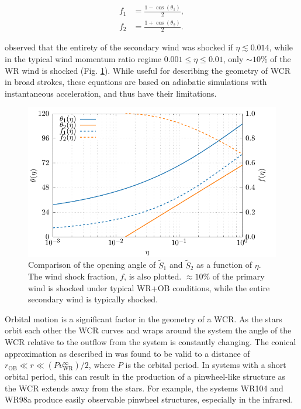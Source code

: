 \begin{subequations}
  \label{eq:windshockfraction}
  \begin{align}
    f_1 & = \frac{1 - \cos\left(\theta_1\right)}{2} , \\
    f_2 & = \frac{1 + \cos\left(\theta_2\right)}{2} .
  \end{align}
\end{subequations}

\noindent
\textcite{pittardCollidingStellarWinds2018} observed that the entirety of the secondary wind was shocked if $\eta \lesssim 0.014$, while in the typical wind momentum ratio regime $0.001 \leq \eta \leq 0.01$, only $\sim 10\%$ of the WR wind is shocked (Fig. \ref{fig:wind-shock-factor}).
While useful for describing the geometry of WCR in broad strokes, these equations are based on adiabatic simulations with instantaneous acceleration, and thus have their limitations.

\begin{figure}[ht]
  \centering
  \includegraphics{assets/wind-shock-factor/shock-factor.pdf}
  \caption[Wind shock fraction, as a function of $\eta$]{Comparison of the opening angle of $\widetilde{S}_1$ and $\widetilde{S}_2$ as a function of $\eta$. The wind shock fraction, $f$, is also plotted. $\approx 10\%$ of the primary wind is shocked under typical WR+OB conditions, while the entire secondary wind is typically shocked.}
  \label{fig:wind-shock-factor}
\end{figure}

Orbital motion is a significant factor in the geometry of a WCR.
As the stars orbit each other the WCR curves and wraps around the system the angle of the WCR relative to the outflow from the system is constantly changing.
The conical approximation as described in \textcite{eichler_particle_1993} was found to be valid to a distance of $r_\text{OB} \ll r \ll (P v^\infty_\text{WR})/2$, where $P$ is the orbital period.
In systems with a short orbital period, this can result in the production of a pinwheel-like structure as the WCR extends away from the stars.
For example, the systems WR104 and WR98a produce easily observable pinwheel structures, especially in the infrared.

